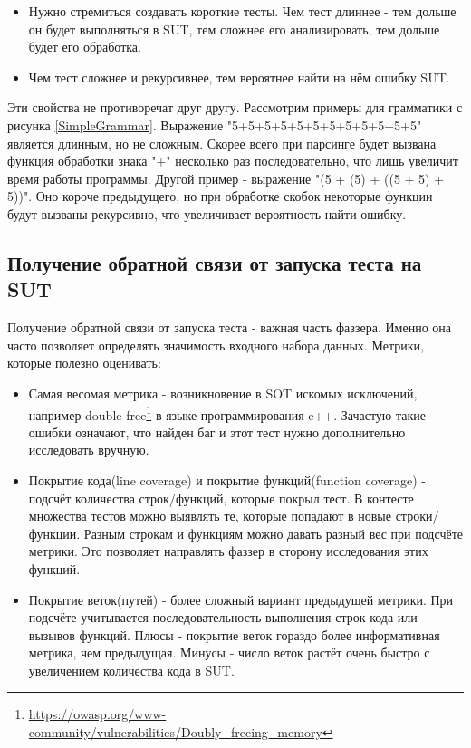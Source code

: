 \documentclass[a4paper]{article}
\begin{document}
\begin{itemize}
\item Нужно стремиться создавать короткие тесты. Чем тест длиннее - тем дольше он будет выполняться в SUT, тем сложнее его анализировать, тем дольше будет его обработка. 
\item Чем тест сложнее и рекурсивнее, тем вероятнее найти на нём ошибку SUT. 
\end{itemize}

Эти свойства не противоречат друг другу. Рассмотрим примеры для грамматики с рисунка \ref{SimpleGrammar}. Выражение "5+5+5+5+5+5+5+5+5+5+5+5" является длинным, но не сложным. Скорее всего при парсинге будет вызвана функция обработки знака "+" несколько раз последовательно, что лишь увеличит время работы программы. Другой пример - выражение "(5 + (5) + ((5 + 5) + 5))". Оно короче предыдущего, но при обработке скобок некоторые функции будут вызваны рекурсивно, что увеличивает вероятность найти ошибку.

\subsection{Получение обратной связи от запуска теста на SUT}
\indent

Получение обратной связи от запуска теста - важная часть фаззера. Именно она часто позволяет определять значимость входного набора данных. Метрики, которые полезно оценивать:

\begin{itemize}
\item Самая весомая метрика - возникновение в SOT искомых исключений,
например double free\footnote[1]{\href{https://owasp.org/www-community/vulnerabilities/Doubly\_freeing\_memory}{https://owasp.org/www-community/vulnerabilities/Doubly\_freeing\_memory}} в языке программирования c++. Зачастую такие ошибки означают, что найден баг и этот тест нужно дополнительно исследовать вручную.
\item Покрытие кода(line coverage) и покрытие функций(function coverage) - подсчёт количества строк/функций, которые покрыл тест. В контесте множества тестов можно выявлять те, которые попадают в новые строки/функции. Разным строкам и функциям можно давать разный вес при подсчёте метрики. Это позволяет направлять фаззер в сторону исследования этих функций.
\item Покрытие веток(путей) - более сложный вариант предыдущей метрики. При подсчёте учитывается последовательность выполнения строк кода или вызывов функций. Плюсы - покрытие веток гораздо более информативная метрика, чем предыдущая. Минусы - число веток растёт очень быстро с увеличением количества кода в SUT.
\end{itemize}
\end{document}
